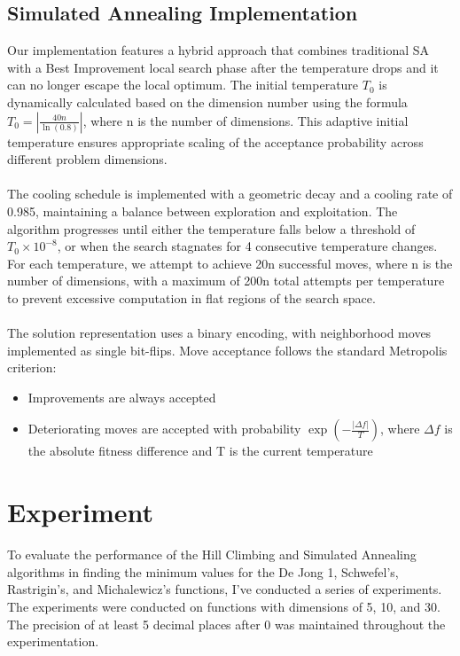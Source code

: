 \documentclass{article}
\begin{document}
\subsection{Simulated Annealing Implementation}
Our implementation features a hybrid approach that combines traditional SA with a Best Improvement local search phase after the temperature drops and it can no longer escape the local optimum. The initial temperature $T_0$ is dynamically calculated based on the dimension number using the formula $T_0 = \left|\frac{40n}{\ln(0.8)}\right|$, where n is the number of dimensions. This adaptive initial temperature ensures appropriate scaling of the acceptance probability across different problem dimensions. \\ \\
The cooling schedule is implemented with a geometric decay and a cooling rate of 0.985, maintaining a balance between exploration and exploitation. The algorithm progresses until either the temperature falls below a threshold of $T_0\times10^{-8}$, or when the search stagnates for 4 consecutive temperature changes. For each temperature, we attempt to achieve 20n successful moves, where n is the number of dimensions, with a maximum of 200n total attempts per temperature to prevent excessive computation in flat regions of the search space. \\ \\
The solution representation uses a binary encoding, with neighborhood moves implemented as single bit-flips. Move acceptance follows the standard Metropolis criterion:
\begin{itemize}
    \item Improvements are always accepted
    \item Deteriorating moves are accepted with probability $\exp\left(-\frac{| \Delta f |}{T}\right)$, where $\Delta f$ is the absolute fitness difference and T is the current temperature
\end{itemize}


\section{Experiment}

To evaluate the performance of the Hill Climbing and Simulated Annealing algorithms in finding the minimum values for the De Jong 1, Schwefel’s, Rastrigin’s, and Michalewicz’s functions, I’ve conducted a series of experiments. The experiments were conducted on functions with dimensions of 5, 10, and 30. The precision of at least 5 decimal places after 0 was maintained throughout the experimentation. \\
\end{document}
